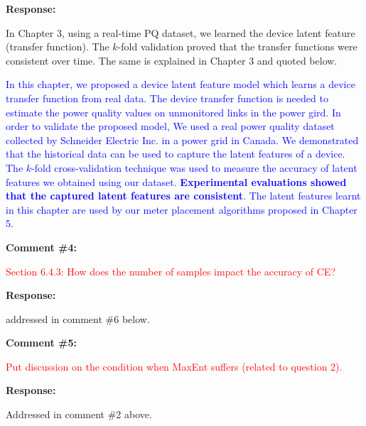 \documentclass[journal]{IEEEtran}
\begin{document}
\vspace{10pt}
\textbf{Response:}
\begin{adjustwidth}{2.5em}{0pt}
In Chapter 3, using a real-time PQ dataset, we learned the device latent feature (transfer function). The $k$-fold validation proved that the transfer functions were consistent over time. The same is explained in Chapter 3 and quoted below.

\vspace{10pt}
\noindent\textcolor{blue}{In this chapter, we proposed a device latent feature model which learns a device transfer function from real data. The device transfer function is needed to estimate the power quality values on unmonitored links in the power gird. In order to validate the proposed model, We used a real power quality dataset collected by Schneider Electric Inc. in a power grid in Canada. We demonstrated that the historical data can be used to capture the latent features of a device. The $k$-fold cross-validation technique was used to measure the accuracy of latent features we obtained using our dataset. \textbf{Experimental evaluations showed that the captured latent features are consistent}. The latent features learnt in this chapter are used by our meter placement algorithms proposed in Chapter 5.}
\end{adjustwidth}



\vspace{30pt}
\textbf{Comment \#4:}
\begin{adjustwidth}{2.5em}{0pt}
\singlespacing \vspace{-10pt}
\textcolor{red}{Section 6.4.3: How does the number of samples impact the accuracy of CE?}
\end{adjustwidth}

\vspace{10pt}
\textbf{Response:}
\begin{adjustwidth}{2.5em}{0pt}
addressed in comment \#6 below.
\end{adjustwidth}


\vspace{30pt}
\textbf{Comment \#5:}
\begin{adjustwidth}{2.5em}{0pt}
\singlespacing \vspace{-10pt}
\textcolor{red}{Put discussion on the condition when MaxEnt suffers (related to question 2).}
\end{adjustwidth}

\vspace{10pt}
\textbf{Response:}
\begin{adjustwidth}{2.5em}{0pt}
Addressed in comment \#2 above.
\end{adjustwidth}
\end{document}
